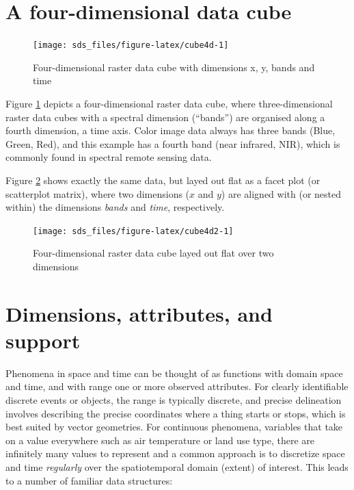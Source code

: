 \documentclass[]{book}
\begin{document}
\hypertarget{a-four-dimensional-data-cube}{%
\section{A four-dimensional data cube}\label{a-four-dimensional-data-cube}}

\begin{figure}

{\centering \texttt{[image: sds\_files/figure-latex/cube4d-1]} 

}

\caption{Four-dimensional raster data cube with dimensions x, y, bands and time}\label{fig:cube4d}
\end{figure}

Figure \ref{fig:cube4d} depicts a four-dimensional raster data
cube, where three-dimensional raster data cubes with a spectral
dimension (``bands'') are organised along a fourth dimension, a time
axis. Color image data always has three bands (Blue, Green, Red),
and this example has a fourth band (near infrared, NIR), which is
commonly found in spectral remote sensing data.

Figure \ref{fig:cube4d2} shows exactly the same data, but layed out
flat as a facet plot (or scatterplot matrix), where two dimensions
(\(x\) and \(y\)) are aligned with (or nested within) the dimensions
\emph{bands} and \emph{time}, respectively.

\begin{figure}

{\centering \texttt{[image: sds\_files/figure-latex/cube4d2-1]} 

}

\caption{Four-dimensional raster data cube layed out flat over two dimensions}\label{fig:cube4d2}
\end{figure}

\hypertarget{dimensions-attributes-and-support}{%
\section{Dimensions, attributes, and support}\label{dimensions-attributes-and-support}}

Phenomena in space and time can be thought of as functions
with domain space and time, and with range one or more observed
attributes. For clearly identifiable discrete events or objects,
the range is typically discrete, and precise delineation involves
describing the precise coordinates where a thing starts or stops,
which is best suited by vector geometries. For continuous phenomena,
variables that take on a value everywhere such as air temperature
or land use type, there are infinitely many values to represent and
a common approach is to discretize space and time \emph{regularly} over
the spatiotemporal domain (extent) of interest. This leads to a
number of familiar data structures:
\end{document}
